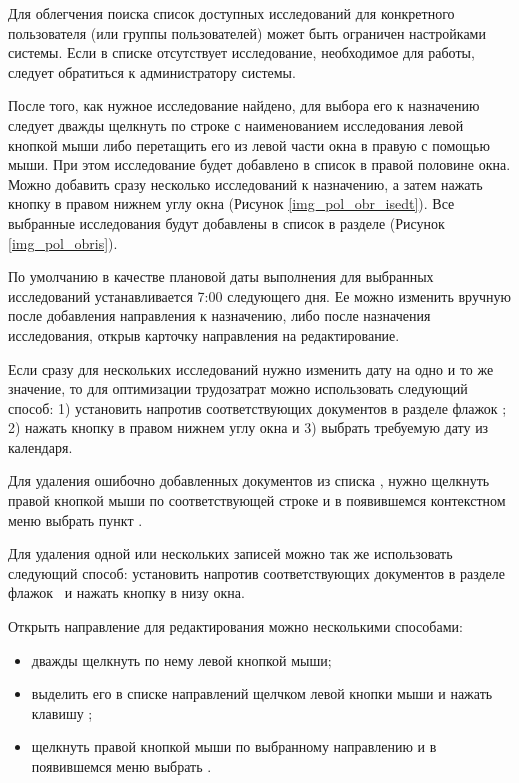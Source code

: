 \begin{prim}
 Для облегчения поиска список доступных исследований для конкретного пользователя (или группы пользователей) может быть ограничен настройками системы. Если в списке отсутствует исследование, необходимое для работы, следует обратиться к администратору системы.
\end{prim}
  
После того, как нужное исследование найдено, для выбора его к назначению следует дважды щелкнуть по строке с наименованием исследования левой кнопкой мыши либо перетащить его из левой части окна в правую с помощью мыши. При этом исследование будет добавлено в список  в правой половине окна. Можно добавить сразу несколько исследований к назначению, а затем нажать кнопку  в правом нижнем углу окна (Рисунок \ref{img_pol_obr_isedt}). Все выбранные исследования будут добавлены в список в разделе  (Рисунок \ref{img_pol_obris}).

По умолчанию в качестве плановой даты выполнения для выбранных исследований устанавливается 7:00 следующего дня. Ее можно изменить вручную после добавления направления к назначению, либо после назначения исследования, открыв карточку направления на редактирование.

\begin{prim}
 Если сразу для нескольких исследований нужно изменить дату на одно и то же значение, то для оптимизации трудозатрат можно использовать следующий способ: 1) установить напротив соответствующих документов в разделе  флажок \putx ; 2) нажать кнопку  в правом нижнем углу окна и 3) выбрать требуемую дату из календаря.
\end{prim}

Для удаления ошибочно добавленных документов из списка , нужно щелкнуть правой кнопкой мыши по соответствующей строке и в появившемся контекстном меню выбрать пункт .

\begin{prim}
 Для удаления одной или нескольких записей можно так же использовать следующий способ: установить напротив соответствующих документов в разделе  флажок \putx~и нажать кнопку  в низу окна.
\end{prim}

Открыть направление для редактирования можно несколькими способами:
\begin{itemize}
 \item дважды щелкнуть по нему левой кнопкой мыши;
 \item выделить его в списке направлений щелчком левой кнопки мыши и нажать клавишу ;
 \item щелкнуть правой кнопкой мыши по выбранному направлению и в появившемся меню выбрать .
\end{itemize}

